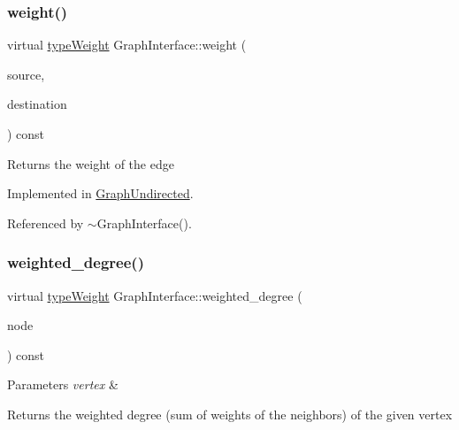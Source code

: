 \subsubsection{\texorpdfstring{weight()}{weight()}}
{\footnotesize\ttfamily virtual \hyperlink{edge_8h_a2e7ea3be891ac8b52f749ec73fee6dd2}{type\+Weight} Graph\+Interface\+::weight (\begin{DoxyParamCaption}\item[{const \hyperlink{edge_8h_a5fbd20c46956d479cb10afc9855223f6}{type\+Vertex} \&}]{source,  }\item[{const \hyperlink{edge_8h_a5fbd20c46956d479cb10afc9855223f6}{type\+Vertex} \&}]{destination }\end{DoxyParamCaption}) const\hspace{0.3cm}{\ttfamily [pure virtual]}}

\begin{DoxyReturn}{Returns}
the weight of the edge 
\end{DoxyReturn}


Implemented in \hyperlink{classGraphUndirected_ae40d431c92d8b4884c7915c44d42f356}{Graph\+Undirected}.



Referenced by $\sim$\+Graph\+Interface().

\mbox{\label{classGraphInterface_a3a4bd9e37e69a4488a48f781e36ea686}} 
\subsubsection{\texorpdfstring{weighted\+\_\+degree()}{weighted\_degree()}}
{\footnotesize\ttfamily virtual \hyperlink{edge_8h_a2e7ea3be891ac8b52f749ec73fee6dd2}{type\+Weight} Graph\+Interface\+::weighted\+\_\+degree (\begin{DoxyParamCaption}\item[{const \hyperlink{edge_8h_a5fbd20c46956d479cb10afc9855223f6}{type\+Vertex} \&}]{node }\end{DoxyParamCaption}) const\hspace{0.3cm}{\ttfamily [pure virtual]}}


\begin{DoxyParams}{Parameters}
{\em vertex} & \\
\hline
\end{DoxyParams}
\begin{DoxyReturn}{Returns}
the weighted degree (sum of weights of the neighbors) of the given vertex 
\end{DoxyReturn}


